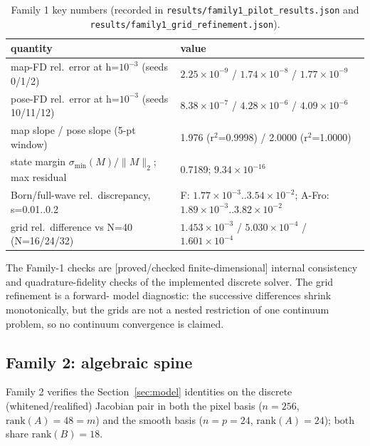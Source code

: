\documentclass[12pt]{article}
\newcommand{\FDL}{\textnormal{[proved/checked finite-dimensional]}}
\begin{document}
\begin{table}[ht]
\centering
\small
\caption{Family 1 key numbers (recorded in
\texttt{results/family1\_pilot\_results.json} and
\texttt{results/family1\_grid\_refinement.json}).}
\label{tab:f1}
\begin{tabular}{p{} p{}}
\toprule
quantity & value \\
\midrule
map-FD rel.\ error at h=$10^{-3}$ (seeds 0/1/2) &
$2.25\times10^{-9}$ / $1.74\times10^{-8}$ / $1.77\times10^{-9}$ \\
pose-FD rel.\ error at h=$10^{-3}$ (seeds 10/11/12) &
$8.38\times10^{-7}$ / $4.28\times10^{-6}$ / $4.09\times10^{-6}$ \\
map slope / pose slope (5-pt window) &
1.976 (r$^2$=0.9998) / 2.0000 (r$^2$=1.0000) \\
state margin $\sigma_{\min}(M)/\|M\|_2$; max residual &
0.7189; $9.34\times10^{-16}$ \\
Born/full-wave rel.\ discrepancy, s=0.01..0.2 &
F: $1.77\times10^{-3}$..$3.54\times10^{-2}$; A-Fro: $1.89\times10^{-3}$..$3.82\times10^{-2}$ \\
grid rel.\ difference vs N=40 (N=16/24/32) &
$1.453\times10^{-3}$ / $5.030\times10^{-4}$ / $1.601\times10^{-4}$ \\
\bottomrule
\end{tabular}
\end{table}

The Family-1 checks are \FDL{} internal consistency and quadrature-fidelity
checks of the implemented discrete solver. The grid refinement is a forward-
model diagnostic: the successive differences shrink monotonically, but the
grids are not a nested restriction of one continuum problem, so no continuum
convergence is claimed.

\subsection{Family 2: algebraic spine}\label{sec:family2}

Family 2 verifies the Section~\ref{sec:model} identities on the discrete
(whitened/realified) Jacobian pair in both the pixel basis
($n=256$, $\mathrm{rank}(A)=48=m$) and the smooth basis ($n=p=24$,
$\mathrm{rank}(A)=24$); both share $\mathrm{rank}(B)=18$.
\end{document}
